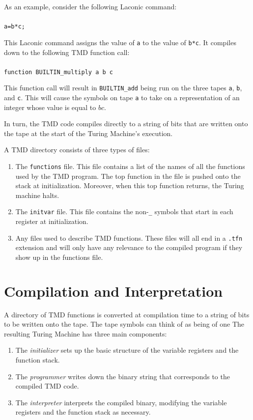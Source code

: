 \documentclass[11pt]{article}
\begin{document}
As an example, consider the following Laconic command: \\ \\
\texttt{a=b*c;} 

This Laconic command assigns the value of \texttt{a} to the value of \texttt{b*c}. It compiles down to the following TMD function call: \\ \\
\texttt{function BUILTIN\_multiply a b c}

This function call will result in \texttt{BUILTIN\_add} being run on the three tapes \texttt{a}, \texttt{b}, and \texttt{c}. This will cause the symbols on tape \texttt{a} to take on a representation of an integer whose value is equal to $bc$.

In turn, the TMD code compiles directly to a string of bits that are written onto the tape at the start of the Turing Machine's execution.

A TMD directory consists of three types of files:

\begin{enumerate}
\item The \texttt{functions} file. This file contains a list of the names of all the functions used by the TMD program. The top function in the file is pushed onto the stack at initialization. Moreover, when this top function returns, the Turing machine halts.
\item The \texttt{initvar} file. This file contains the non-\texttt{\_} symbols that start in each register at initialization. 
\item Any files used to describe TMD functions. These files will all end in a \texttt{.tfn} extension and will only have any relevance to the compiled program if they show up in the functions file.
\end{enumerate}

\section{Compilation and Interpretation}

A directory of TMD functions is converted at compilation time to a string of bits to be written onto the tape. The tape symbols can think of as being of one The resulting Turing Machine has three main components:

\begin{enumerate}
\item The \emph{initializer} sets up the basic structure of the variable registers and the function stack.
\item The \emph{programmer} writes down the binary string that corresponds to the compiled TMD code.
\item The \emph{interpreter} interprets the compiled binary, modifying the variable registers and the function stack as necessary.
\end{enumerate}
\end{document}
